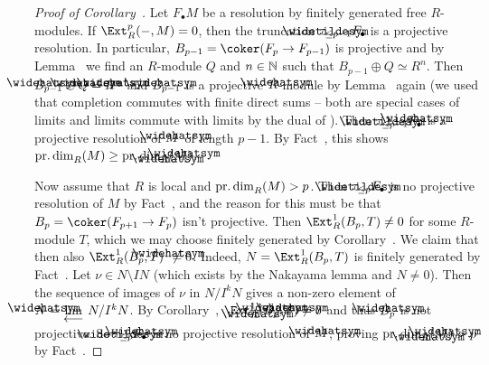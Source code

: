 \documentclass[a4paper,parskip=half,numbers=enddot, DIV=12]{scrreprt}
\begin{document}
\begin{proof}[Proof of Corollary~]
	Let $F_\bullet M$ be a resolution by finitely generated free $R$-modules. If $\Ext_R^p(-,M)=0$, then the truncation $\snake{\tau}_{\leq p-1}F_\bullet$ is a projective resolution. In particular, $B_{p-1}=\coker(F_p\morphism F_{p-1})$ is projective and by Lemma~ we find an $R$-module $Q$ and $n\in\mathbb{N}$ such that $B_{p-1}\oplus Q\simeq R^n$. Then $\roof{B}_{p-1}\oplus\roof{Q}=\roof{R}^n$ and $\roof{B}_{p-1}$ is a projective $\roof{R}$-module by Lemma~ again (we used that completion commutes with finite direct sums -- both are special cases of limits and limits commute with limits by the dual of \cite[Lemma~A.1.4]{alggeo2}). Then $\snake{\tau}_{\leq p-1}\roof{F}_\bullet$ is a projective resolution of $\roof{M}$ of length $p-1$. By Fact~, this shows $\pdim_R(M)\geq\pdim_{\roof{R}}(\roof{M})$.
	
	Now assume that $R$ is local and $\operatorname{pr.dim}_R(M)>p$. Then $\snake{\tau}_{\leq p}F_\bullet$ is no projective resolution of $M$ by Fact~, and the reason for this must be that $B_p=\coker(F_{p+1}\morphism F_p)$ isn't projective. Then $\Ext_R^1(B_p,T)\neq 0$ for some $R$-module $T$, which we may choose finitely generated by Corollary~. We claim that then also $\Ext_R^1(B_p,T)\roof{\phantom{)}}\neq 0$. Indeed, $N=\Ext_R^1(B_p,T)$ is finitely generated by Fact~. Let $\nu\in N\setminus IN$ (which exists by the Nakayama lemma and $N\neq 0$). Then the sequence of images of $\nu$ in $N/I^kN$ gives a non-zero element of $\roof{N}=\limit N/I^kN$. By Corollary~, $\Ext_{\roof{R}}^1(\roof{B}_p,\roof{T})\neq 0$ and thus $\roof{B}_p$ is not projective. So $\snake{\tau}_{\leq p}\roof{F}_\bullet$ is no projective resolution of $\roof{M}$, proving $\pdim_{\roof{R}}(\roof{M})>p$ by Fact~.
\end{proof}
\end{document}
